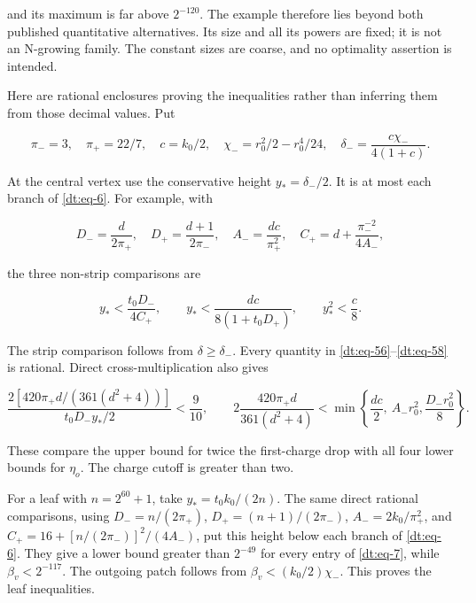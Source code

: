 and its maximum is far above \(2^{-120}\). The example therefore lies beyond
both published quantitative alternatives. Its size and all its powers
are fixed; it is not an N-growing family. The constant sizes are coarse,
and no optimality assertion is intended.

Here are rational enclosures proving the inequalities rather than
inferring them from those decimal values. Put

\begin{equation}\label{dt:eq-56}
\pi_- =3,\quad \pi_+=22/7,\quad c=k_0/2,\quad
 \chi_-=r_0^2/2-r_0^4/24,\quad
 \delta_- =\frac{c\chi_-}{4(1+c)}.
\end{equation}

At the central vertex use the conservative height
\(y_* =\delta_-/2\). It is at most each branch of \eqref{dt:eq-6}. For example,
with

\begin{equation}\label{dt:eq-57}
D_- =\frac d{2\pi_+},\quad D_+=\frac{d+1}{2\pi_-},\quad
 A_- =\frac{dc}{\pi_+^2},\quad
 C_+=d+\frac{\pi_-^{-2}}{4A_-},
\end{equation}

the three non-strip comparisons are

\begin{equation}\label{dt:eq-58}
y_*<\frac{t_0D_-}{4C_+},\qquad
 y_*<\frac{dc}{8(1+t_0D_+)},\qquad y_*^2<\frac c8.
\end{equation}

The strip comparison follows from \(\delta\ge\delta_-\).
Every quantity in \eqref{dt:eq-56}--\eqref{dt:eq-58} is rational. Direct cross-multiplication
also gives

\begin{equation}\label{dt:eq-59}
\frac{2[420\pi_+d/(361(d^2+4))]}
             {t_0D_-y_*/2}<\frac9{10},
 \qquad
 2\frac{420\pi_+d}{361(d^2+4)}
 <\min\left\{\frac{dc}{2},\ A_-r_0^2,
                          \frac{D_-r_0^2}{8}\right\}.
\end{equation}

These compare the upper bound for twice the first-charge drop with
all four lower bounds for \(\eta_o\). The charge cutoff is greater
than two.

For a leaf with \(n=2^{60}+1\), take
\(y_*=t_0k_0/(2n)\). The same direct rational comparisons, using
\(D_-=n/(2\pi_+)\), \(D_+=(n+1)/(2\pi_-)\),
\(A_-=2k_0/\pi_+^2\), and
\(C_+=16+[n/(2\pi_-)]^2/(4A_-)\), put this height below each
branch of \eqref{dt:eq-6}. They give a lower bound greater than \(2^{-49}\)
for every entry of \eqref{dt:eq-7}, while \(\beta_v<2^{-117}\).
The outgoing patch follows from
\(\beta_v<(k_0/2)\chi_-\). This proves the leaf inequalities.
